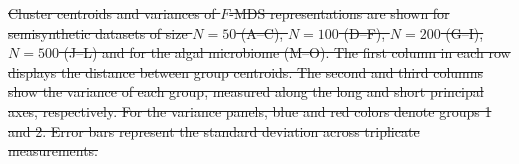 \documentclass[11pt]{article}
\newcommand{\1}{{\rm 1}\kern-0.24em{\rm I}}
\providecommand{\DIFdeltex}[1]{{\protect\color{red}\sout{#1}}}                      %
\providecommand{\DIFdelbegin}{} %
\providecommand{\DIFdelend}{} %
\providecommand{\DIFdelFL}[1]{\DIFdel{#1}} %
\providecommand{\DIFdel}[1]{\texorpdfstring{\DIFdeltex{#1}}{}} %
\newcommand{\DIFscaledelfig}{0.5}
\newlength{\DIFdelgraphicswidth} %
\newlength{\DIFdelgraphicsheight} %
\newcommand{\DIFdelincludegraphics}[2][]{%
\sbox{\DIFdelgraphicsbox}{\DIFOincludegraphics[#1]{#2}}%
\settoboxwidth{\DIFdelgraphicswidth}{\DIFdelgraphicsbox} %
\settoboxtotalheight{\DIFdelgraphicsheight}{\DIFdelgraphicsbox} %
\scalebox{\DIFscaledelfig}{%
\parbox[b]{\DIFdelgraphicswidth}{\usebox{\DIFdelgraphicsbox}\\[-\baselineskip] \rule{\DIFdelgraphicswidth}{0em}}\llap{\resizebox{\DIFdelgraphicswidth}{\DIFdelgraphicsheight}{%
\setlength{\unitlength}{\DIFdelgraphicswidth}%
\begin{picture}(1,1)%
\thicklines\linethickness{2pt} %
{\color[rgb]{1,0,0}\put(0,0){\framebox(1,1){}}}%
{\color[rgb]{1,0,0}\put(0,0){\line( 1,1){1}}}%
{\color[rgb]{1,0,0}\put(0,1){\line(1,-1){1}}}%
\end{picture}%
}\hspace*{3pt}}} %
} %
\DeclareRobustCommand{\DIFdelbegin}{\DIFOdelbegin \let\includegraphics\DIFdelincludegraphics} %
\DeclareRobustCommand{\DIFdelend}{\DIFOaddend \let\includegraphics\DIFOincludegraphics} %
\begin{document}
\DIFdelbegin %
{%
\DIFdelFL{Cluster centroids and variances of $F$-MDS representations are shown for semisynthetic datasets of size $N=50$ (A–C), $N=100$ (D–F), $N=200$ (G–I), $N=500$ (J–L) and for the algal microbiome (M–O). The first column in each row displays the distance between group centroids. The second and third columns show the variance of each group, measured along the long and short principal axes, respectively. For the variance panels, blue and red colors denote groups 1 and 2. Error bars represent the standard deviation across triplicate measurements.}}
\DIFdelend %
\end{document}
